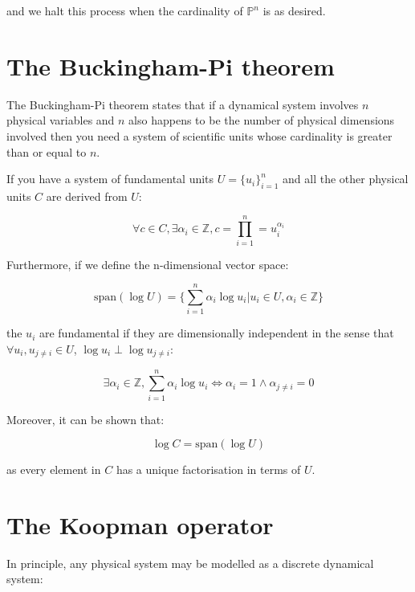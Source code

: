 \documentclass{article}
\begin{document}
and we halt this process when the cardinality of $\mathbb{P}^n$ is as desired.

\newpage

\section{The Buckingham-Pi theorem}

The Buckingham-Pi theorem states that if a dynamical system involves $n$ physical variables and $n$ also happens
to be the number of physical dimensions involved then you need a system of scientific units whose cardinality is
greater than or equal to $n$.

If you have a system of fundamental units $U = \{u_i\}_{i=1}^n$ and all the other physical units $C$ are derived
from $U$:

\begin{equation}
\forall c \in C, \exists \alpha_i \in \mathbb{Z}, c = \prod_{i=1}^n = u_i^{\alpha_i}
\end{equation}

Furthermore, if we define the n-dimensional vector space:

\begin{equation}
\text{span}(\log U) = \big\{ \sum_{i=1}^n \alpha_i \log u_i \lvert u_i \in U, \alpha_i \in \mathbb{Z} \big\}
\end{equation}

the $u_i$ are fundamental if they are dimensionally independent in the sense that $\forall u_i, u_{j \neq i} \in U$,
$\log u_i \perp \log u_{j \neq i}$:

\begin{equation}
\exists \alpha_i \in \mathbb{Z}, \sum_{i=1}^n \alpha_i \log u_i \iff \alpha_i = 1 \land \alpha_{j \neq i} = 0
\end{equation}

Moreover, it can be shown that:

\begin{equation}
\log C = \text{span}(\log U)
\end{equation}

as every element in $C$ has a unique factorisation in terms of $U$.

\section{The Koopman operator}

In principle, any physical system may be modelled as a discrete dynamical system:
\end{document}
